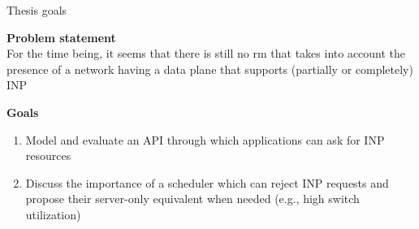 \begin{frame}[fragile]{Thesis goals}
    
    \textbf{Problem statement}\\
    For the time being, it seems that there is still no \gls*{rm} that takes into account the presence of a network having a data plane that supports (partially or completely) INP

    \vspace{5mm}

    \textbf{Goals}\\
    \begin{enumerate}
        \item Model and evaluate an API through which applications can ask for INP resources
        \item Discuss the importance of a scheduler which can reject INP requests and propose their server-only equivalent when needed (e.g., high switch utilization)
    \end{enumerate}

\end{frame}
